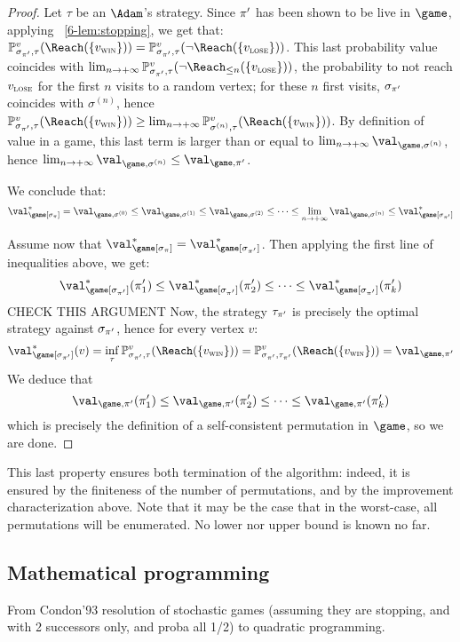 \begin{proof}
Let $\tau$ be an $\Adam$'s strategy. Since $\pi'$ has been shown to
be live in $\game$, applying ~\cref{6-lem:stopping}, we
get that: $\probm^v_{\sigma_{\perm'},\tau} (\Reach(\{\vwin\})) =
\probm^v_{\sigma_{\perm'},\tau} (\neg\Reach(\{\vlose\}))$. This last
probability value coincides with $\lim_{n \to +\infty}
\probm^v_{\sigma_{\perm'},\tau} (\neg\Reach_{\le n}(\{\vlose\}))$,
the probability to not reach $v_{\textsc{lose}}$ for the first $n$ visits to a
random vertex; for these $n$ first visits, $\sigma_{\pi'}$
coincides with $\sigma^{(n)}$, hence
$\probm^v_{\sigma_{\perm'},\tau} (\Reach(\{\vwin\})) \ge \lim_{n\to
+\infty} \probm^v_{\sigma^{(n)},\tau} (\Reach(\{\vwin\}))$. By
definition of value in a game, this last term is larger than or
equal to $\lim_{n \to+\infty}\val_{\game,\sigma^{(n)}}$, hence
$\lim_{n \to+\infty}\val_{\game,\sigma^{(n)}} \le
\val_{\game,\perm'}$.

We conclude that:
\[
\val^*_{\game[\sigma_\perm]} = \val_{\game,\sigma^{(0)}} \le
\val_{\game,\sigma^{(1)}} \le \val_{\game,\sigma^{(2)}} \le \dots\le
\lim_{n \to +\infty} \val_{\game,\sigma^{(n)}} \le
\val^*_{\game[\sigma_{\perm'}]}
\]

\medskip Assume now that $\val^*_{\game[\sigma_\perm]} =
\val^*_{\game[\sigma_{\perm'}]}$. Then applying the first line of
inequalities above, we get:
\[
\val^*_{\game[\sigma_{\perm'}]}(\perm'_1) \le
\val^*_{\game[\sigma_{\perm'}]}(\perm'_2) \le \dots \le
\val^*_{\game[\sigma_{\perm'}]}(\perm'_k)
\]
CHECK THIS ARGUMENT 
Now, the strategy $\tau_{\pi'}$ is precisely the optimal strategy
against $\sigma_{\pi'}$, hence for every vertex $v$:
\[
\val^*_{\game[\sigma_{\perm'}]}(v) = \inf_\tau
\probm^v_{\sigma_{\perm'},\tau} (\Reach(\{\vwin\})) =
\probm^v_{\sigma_{\perm'},\tau_{\perm'}} (\Reach(\{\vwin\})) =
\val_{\game,\perm'}
\]
We deduce that
\[
\val_{\game,\perm'}(\perm'_1) \le \val_{\game,\perm'}(\perm'_2) \le
\dots \le \val_{\game,\perm'}(\perm'_k)
\]
which is precisely the definition of a self-consistent permutation
in $\game$, so we are done.
\end{proof}

This last property ensures both termination of the algorithm: indeed,
it is ensured by the finiteness of the number of permutations, and by
the improvement characterization above. Note that it may be the case
that in the worst-case, all permutations will be enumerated. No lower
nor upper bound is known no far.

\subsection{Mathematical programming}
From Condon'93 resolution of stochastic games (assuming they are
stopping, and with 2 successors only, and proba all 1/2) to quadratic
programming.
